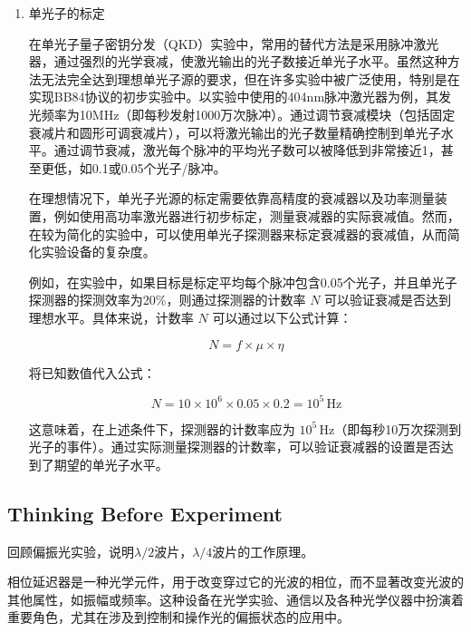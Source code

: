 \begin{enumerate}
\begin{itemize}
		例如，若激光器的发射频率为10 MHz，每个脉冲的平均光子数为0.1，探测器的计数率 \( N \) 为 500,000 次/秒，则探测器的效率为：
		
		\[
		\eta = \frac{N}{f \cdot \mu} = \frac{500,000}{10 \times 10^6 \cdot 0.1} = 0.5
		\]
		
		因此，探测器的效率为50\%。
	\end{itemize}
	
	\item 单光子的标定
	
	在单光子量子密钥分发（QKD）实验中，常用的替代方法是采用脉冲激光器，通过强烈的光学衰减，使激光输出的光子数接近单光子水平。虽然这种方法无法完全达到理想单光子源的要求，但在许多实验中被广泛使用，特别是在实现BB84协议的初步实验中。以实验中使用的404nm脉冲激光器为例，其发光频率为10MHz（即每秒发射1000万次脉冲）。通过调节衰减模块（包括固定衰减片和圆形可调衰减片），可以将激光输出的光子数量精确控制到单光子水平。通过调节衰减，激光每个脉冲的平均光子数可以被降低到非常接近1，甚至更低，如0.1或0.05个光子/脉冲。
	
	在理想情况下，单光子光源的标定需要依靠高精度的衰减器以及功率测量装置，例如使用高功率激光器进行初步标定，测量衰减器的实际衰减值。然而，在较为简化的实验中，可以使用单光子探测器来标定衰减器的衰减值，从而简化实验设备的复杂度。
	
	例如，在实验中，如果目标是标定平均每个脉冲包含0.05个光子，并且单光子探测器的探测效率为20\%，则通过探测器的计数率 \(N\) 可以验证衰减是否达到理想水平。具体来说，计数率 \(N\) 可以通过以下公式计算：
	
	\[
	N = f \times \mu \times \eta
	\]
	
	将已知数值代入公式：
	
	\[
	N = 10 \times 10^6 \times 0.05 \times 0.2 = 10^5 \, \text{Hz}
	\]
	
	这意味着，在上述条件下，探测器的计数率应为 \( 10^5 \, \text{Hz} \)（即每秒10万次探测到光子的事件）。通过实际测量探测器的计数率，可以验证衰减器的设置是否达到了期望的单光子水平。
\end{enumerate}


\subsection{Thinking Before Experiment}
\begin{question}
	回顾偏振光实验，说明$\lambda/2$波片，$\lambda/4$波片的工作原理。
\end{question}
相位延迟器是一种光学元件，用于改变穿过它的光波的相位，而不显著改变光波的其他属性，如振幅或频率。这种设备在光学实验、通信以及各种光学仪器中扮演着重要角色，尤其在涉及到控制和操作光的偏振状态的应用中。

